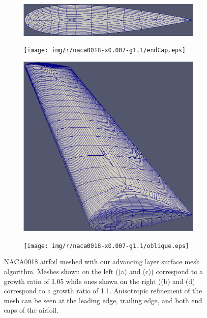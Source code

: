 \begin{figure}
	
	\centering
	
	\begin{subfigure}{0.4\textwidth}
		\centering
		\includegraphics[width = 0.9\linewidth, trim={0 7cm  0 7cm},clip]{img/r/naca0018-x0.007-g1.05/endCap.eps}
		\caption{}
		\label{fig-endCap-low}
	\end{subfigure}%
	\begin{subfigure}{0.4\textwidth}
		\centering
		\texttt{[image: img/r/naca0018-x0.007-g1.1/endCap.eps]}
		\caption{}
		\label{fig-endCap-high}
	\end{subfigure}
	
	\begin{subfigure}{0.4\textwidth}
		\centering
		\includegraphics[width=0.9\linewidth]{img/r/naca0018-x0.007-g1.05/oblique.eps}
		\caption{}
		\label{fig-oblique-low}
	\end{subfigure}%
	\begin{subfigure}{0.4\textwidth}
		\centering
		\texttt{[image: img/r/naca0018-x0.007-g1.1/oblique.eps]}
		\caption{}
		\label{fig-oblique-high}
	\end{subfigure}%
	\caption[EDAMSurf mesh for extruded NACA0018 airfoil profile.]{NACA0018 airfoil meshed with our advancing layer surface mesh algorithm. Meshes shown on the left ((a) and (c)) correspond to a growth ratio of 1.05 while ones shown on the right ((b) and (d) correspond to a growth ratio of 1.1. Anisotropic refinement of the mesh can be seen at the leading edge, trailing edge, and both end caps of the airfoil.}
	\label{fig-naca}
\end{figure}

